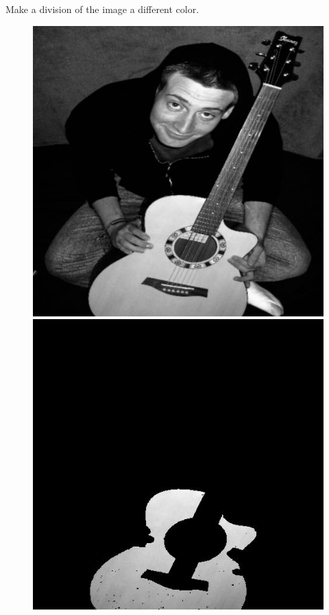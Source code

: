 \begin{problem}
Make a division of the image a different color.
\end{problem}


\vfill
\begin{figure}[ht]
\begin{minipage}[b]{0.47\linewidth}
\centering
\includegraphics[width=\textwidth]{MSTseg1.jpg}
\end{minipage}
\hspace{0.5cm}
\begin{minipage}[b]{0.47\linewidth}
\centering
\includegraphics[width=\textwidth]{MSTseg2.jpg}

\end{minipage}
\end{figure}
